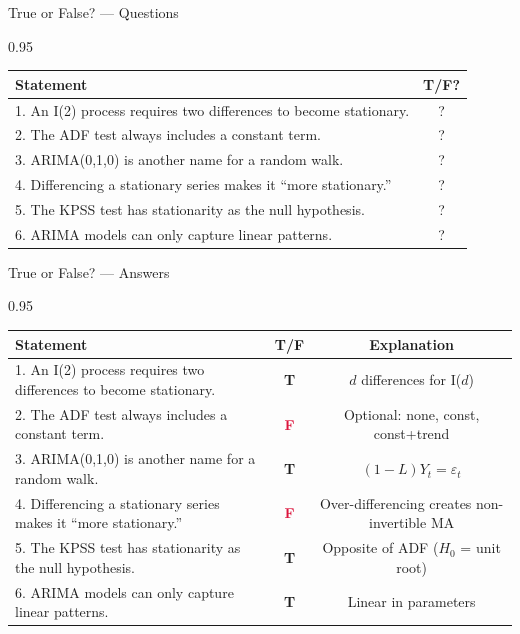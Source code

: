 \documentclass[9pt, aspectratio=169, t]{beamer}
\begin{document}
\begin{frame}{True or False? --- Questions}
    \begin{cminipage}{0.95\textwidth}
    \footnotesize
    \begin{center}
    \begin{tabular}{p{9cm}c}
        \toprule
        \textbf{Statement} & \textbf{T/F?} \\
        \midrule
        1. An I(2) process requires two differences to become stationary. & ? \\[0.15cm]
        2. The ADF test always includes a constant term. & ? \\[0.15cm]
        3. ARIMA(0,1,0) is another name for a random walk. & ? \\[0.15cm]
        4. Differencing a stationary series makes it ``more stationary.'' & ? \\[0.15cm]
        5. The KPSS test has stationarity as the null hypothesis. & ? \\[0.15cm]
        6. ARIMA models can only capture linear patterns. & ? \\
        \bottomrule
    \end{tabular}
    \end{center}
    \end{cminipage}
\end{frame}

\begin{frame}{True or False? --- Answers}
    \begin{cminipage}{0.95\textwidth}
    \scriptsize
    \begin{center}
    \begin{tabular}{p{7.5cm}cc}
        \toprule
        \textbf{Statement} & \textbf{T/F} & \textbf{Explanation} \\
        \midrule
        1. An I(2) process requires two differences to become stationary. & \textcolor{Forest}{\textbf{T}} & {\tiny $d$ differences for I($d$)} \\[0.08cm]
        2. The ADF test always includes a constant term. & \textcolor{Crimson}{\textbf{F}} & {\tiny Optional: none, const, const+trend} \\[0.08cm]
        3. ARIMA(0,1,0) is another name for a random walk. & \textcolor{Forest}{\textbf{T}} & {\tiny $(1-L)Y_t = \varepsilon_t$} \\[0.08cm]
        4. Differencing a stationary series makes it ``more stationary.'' & \textcolor{Crimson}{\textbf{F}} & {\tiny Over-differencing creates non-invertible MA} \\[0.08cm]
        5. The KPSS test has stationarity as the null hypothesis. & \textcolor{Forest}{\textbf{T}} & {\tiny Opposite of ADF ($H_0$ = unit root)} \\[0.08cm]
        6. ARIMA models can only capture linear patterns. & \textcolor{Forest}{\textbf{T}} & {\tiny Linear in parameters} \\
        \bottomrule
    \end{tabular}
    \end{center}
    \end{cminipage}
\end{frame}
\end{document}
